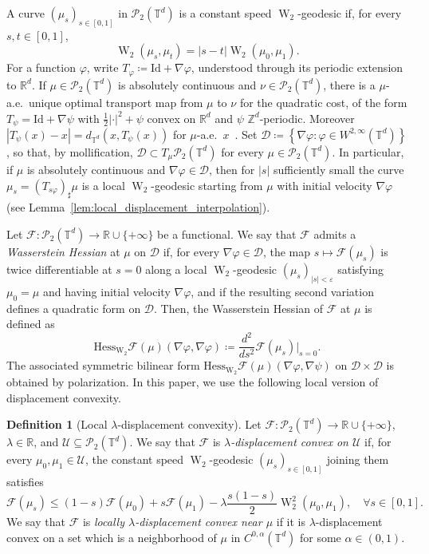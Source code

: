 \documentclass[11pt]{article}
\numberwithin{equation}{section}
\theoremstyle{definition}
\newtheorem{definition}[theorem]{Definition}
\newcommand{\R}{\mathbb{R}}
\newcommand{\T}{\mathbb{T}}
\newcommand{\Pcal}{\mathcal{P}}
\newcommand{\F}{\mathcal{F}}
\newcommand{\Wtwo}{\operatorname{W}_2}
\begin{document}
A curve $(\mu_s)_{s \in [0,1]}$ in $\Pcal_2(\T^d)$ is a constant speed $\Wtwo$-geodesic if, for every $s, t \in [0,1]$, 
\[
\Wtwo(\mu_s, \mu_t) = |s-t| \Wtwo(\mu_0,\mu_1).
\]
For a function $\varphi$, write $T_\varphi \coloneqq \mathrm{Id} + \nabla\varphi$, understood through its periodic extension to $\R^d$.
If $\mu \in \Pcal_2(\T^d)$ is absolutely continuous and $\nu \in \Pcal_2(\T^d)$, there is a $\mu$-a.e.\ unique optimal transport map from $\mu$ to $\nu$ for the quadratic cost, of the form $T_\psi = \mathrm{Id} + \nabla\psi$ with $\frac{1}{2}|\cdot|^2 + \psi$ convex on $\R^d$ and $\psi$ $\mathbb{Z}^d$-periodic.
Moreover $|T_\psi(x) - x| = d_{\T^d}(x, T_\psi(x))$ for $\mu$-a.e.\ $x$~\cite{cordero1999transport}.
Set $\mathscr{D} \coloneqq \left\{\nabla\varphi : \varphi \in W^{2,\infty}(\T^d)\right\}$, so that, by mollification, $\mathscr{D} \subset T_\mu\Pcal_2(\T^d)$ for every $\mu \in \Pcal_2(\T^d)$.
In particular, if $\mu$ is absolutely continuous and $\nabla\varphi \in \mathscr{D}$, then for $|s|$ sufficiently small the curve $\mu_s = (T_{s\varphi})_{\sharp}\mu$ is a local $\Wtwo$-geodesic starting from $\mu$ with initial velocity $\nabla\varphi$ (see Lemma~\ref{lem:local_displacement_interpolation}).

Let $\mathcal{F} : \Pcal_2(\T^d) \to \R \cup \{+\infty\}$ be a functional.
We say that $\mathcal{F}$ admits a {\em Wasserstein Hessian} at $\mu$ on $\mathscr{D}$ if, for every $\nabla\varphi \in \mathscr{D}$, the map $s \mapsto \mathcal{F}(\mu_s)$ is twice differentiable at $s = 0$ along a local $\Wtwo$-geodesic $(\mu_s)_{|s|< \varepsilon}$ satisfying $\mu_0 = \mu$ and having initial velocity $\nabla \varphi$, and if the resulting second variation defines a quadratic form on $\mathscr{D}$.
Then, the Wasserstein Hessian of $\mathcal{F}$ at $\mu$ is defined as
\[
\mathrm{Hess}_{\Wtwo} \mathcal{F}(\mu)(\nabla\varphi, \nabla\varphi) \coloneqq \frac{d^2}{ds^2} \mathcal{F}(\mu_s)\Big|_{s=0}.
\]
The associated symmetric bilinear form $\mathrm{Hess}_{\Wtwo} \mathcal{F}(\mu)(\nabla \varphi, \nabla\psi)$ on $\mathscr{D} \times \mathscr{D}$ is obtained by polarization.
In this paper, we use the following local version of displacement convexity.

\begin{definition}[Local $\lambda$-displacement convexity]
    \label{def:local-strong-displacement-convexity}
    Let $\F : \Pcal_2(\T^d) \to \R \cup \{+\infty\}$, $\lambda \in \R$, and $\mathcal{U} \subseteq \Pcal_2(\T^d)$.
    We say that $\F$ is {\em $\lambda$-displacement convex on $\mathcal{U}$} if, for every $\mu_0, \mu_1 \in \mathcal{U}$, the constant speed $\Wtwo$-geodesic $(\mu_s)_{s \in [0,1]}$ joining them satisfies
    \[
    \F(\mu_s) \le (1-s)\F(\mu_0) + s \F(\mu_1) - \lambda\frac{s(1-s)}{2} \Wtwo^2(\mu_0,\mu_1), \quad \forall s \in [0,1].
    \]
    We say that $\F$ is {\em locally $\lambda$-displacement convex near $\mu$} if it is $\lambda$-displacement convex on a set which is a neighborhood of $\mu$ in $C^{0,\alpha}(\T^d)$ for some $\alpha \in (0,1)$.
\end{definition}
\end{document}
